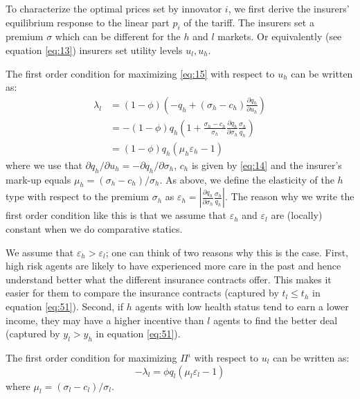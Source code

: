 \documentclass[a4paper,12pt]{article}
\begin{document}
To characterize the optimal prices set by innovator \(i\), we first derive the insurers' equilibrium response to the linear part \(p_i\) of the tariff. The insurers set a premium \(\sigma\) which can be different for the \(h\) and \(l\) markets. Or equivalently (see equation \eqref{eq:13}) insurers set utility levels \(u_l,u_h\).

The first order condition for maximizing \eqref{eq:15}  with respect to \(u_h\) can be written as:
\begin{align}
\nonumber
\lambda_l &= (1-\phi) \left(-q_h + (\sigma_h-c_h) \frac{\partial q_h}{\partial u_h}   \right)\\
\nonumber &=- (1-\phi) q_h \left(1 + \frac{\sigma_h-c_h}{\sigma_h} \frac{\partial q_h}{\partial \sigma_h} \frac{\sigma_h}{q_{h}}   \right)\\
\label{eq:26}
          & = (1-\phi) q_h (\mu_h \varepsilon_h-1)
\end{align}
where we use that \(\partial q_h/\partial u_h = - \partial q_h/\partial \sigma_h\), \(c_h\) is given by \eqref{eq:14} and the insurer's mark-up equals \(\mu_h = (\sigma_{h}-c_h)/\sigma_h\). As above, we define the elasticity of the \(h\) type with respect to the premium \(\sigma_h\) as \(\varepsilon_h = |\frac{\partial q_h}{\partial \sigma_h} \frac{\sigma_h}{q_{h}}|\). The reason why we write the first order condition like this is that we assume that \(\varepsilon_h\) and \(\varepsilon_l\) are (locally) constant when we do comparative statics.

We assume that \(\varepsilon_{h} > \varepsilon_{l}\); one can think of two reasons why this is the case. First, high risk agents are likely to have experienced more care in the past and hence understand better what the different insurance contracts offer. This makes it easier for them to compare the insurance contracts (captured by \(t_l \le t_h\) in equation \eqref{eq:51}). Second, if \(h\) agents with low health status tend to earn a lower income, they may have a higher incentive than \(l\) agents to find the better deal (captured by \(y_l>y_h\) in equation \eqref{eq:51}).

The first order condition for maximizing \(\Pi^{\iota}\) with respect to \(u_l\) can be written as:
\begin{equation}
\label{eq:36}
-\lambda_l = \phi q_l (\mu_l \varepsilon_l -1)
\end{equation}
where \(\mu_l=(\sigma_l-c_l)/\sigma_l\).
\end{document}
